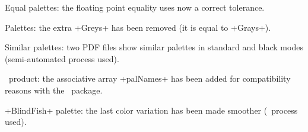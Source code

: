 \documentclass{tutodoc}
\begin{document}
\small

\begin{tdocfix}
    \item Equal palettes: the floating point equality uses now a correct tolerance.
\end{tdocfix}




\begin{tdocbreak}
    \item Palettes: the extra +Greys+ has been removed (it is equal to +Grays+).
\end{tdocbreak}




\begin{tdocnew}
    \item Similar palettes: two PDF files show similar palettes in standard and black modes (semi-automated process used).
\end{tdocnew}




\begin{tdocupdate}
    \item \LUADRAW\ product: the associative array +palNames+ has been added for compatibility reasons with the \LUADRAW\ package.


    \item {}+BlindFish+ palette: the last color variation has been made smoother (\LUADRAW\ process used).
\end{tdocupdate}
\end{document}
